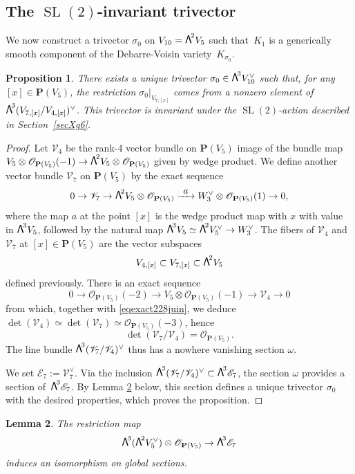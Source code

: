 \documentclass[JEP,XML,SOM,Unicode, NoEqCountersInSection,NoFloatCountersInSection]{cedram}
\let\mathcal\mathscr
\newcommand\To[1]{\mathchoice{\xrightarrow{\textstyle\kern4pt#1\kern3pt}}{\stackrel{#1}{\longrightarrow}}{}{}}
\newtheorem{lemm}{Lemma}[section]
\newtheorem{prop}[lemm]{Proposition}
\theoremstyle{definition}
\renewcommand\P{{\mathbf P}}\let\PP\P
\newcommand\cE{\mathcal{E}}
\newcommand\cO{\mathcal{O}}\let\OO\cO
\newcommand\cV{\mathcal{V}}
\let\isom\simeq
\let\cong\simeq
\let\dual\vee
\DeclareMathOperator{\SL}{SL}
\newcommand\bw[1]{{\hbox{\large$\mathsf{\Lambda}$}^{\!#1}}}
\begin{document}
\subsection{The $\SL(2)$-invariant trivector}\label{se62}

We now construct a trivector $\sigma_0$ on $V_{10}=\bw2V_5$ such that~$K_1$ is a generically smooth component of the Debarre-Voisin
variety~$K_{\sigma_0}$.

\begin{prop}\label{proexistencesigma}
There exists a unique trivector
$\sigma_0\in \bw3V_{10}^\dual$ such that,
for any \hbox{$[x]\!\in\!\P(V_5)$},
the restriction
$\sigma_{0}\vert_{ V_{7,[x]}}$ comes from a nonzero element of $\bw3(V_{7,[x]}/V_{4,[x]})^\dual$. This trivector is invariant under the $\SL(2)$-action described in Section~\ref{secXg6}.
\end{prop}

\begin{proof}
Let $\cV_4$ be the rank-4 vector bundle on $\P(V_5)$ image of the
bundle map $V_5\otimes \cO_{\P(V_5)}(-1)
\to\bw2V_5\otimes \cO_{\P(V_5)}$ given by wedge product. We define another vector bundle
$\cV_7$ on $\P(V_5)$ by the exact sequence
\begin{equation} \label{eqexact228juin}
0\to \cV_7\to \bw2V_5\otimes \cO_{\P(V_5)}
\To{a} W^\dual_3\otimes \cO_{\P(V_5)}(1)\to 0,
\end{equation}
where the map $a$ at the point $[x]$ is the wedge product map with $x$ with value in
$\bw3V_5$, followed by the natural map $\bw3V_5\cong \bw2 V_5^\dual\to W_3^\dual$. The fibers of $\cV_4$ and $\cV_7$ at $[x]\in \P(V_5)$ are the vector subspaces
\[
V_{4,[x]}\subset V_{7,[x]}\subset \bw2V_5 
\]
defined previously. There is an exact sequence
\[
0\to \cO_{\P(V_5)}(-2)\to V_5\otimes \cO_{\P(V_5)}(-1)
\to \cV_4 \to 0
\]
from which, together with \eqref{eqexact228juin}, we deduce
$\det (\cV_4)\isom \det ( \cV_7)\isom\cO_{\P(V_5)}(-3) $,
hence
\[
\det(\cV_7/\cV_4)=\cO_{\P(V_5)}.
\]
The line bundle $\bw3(\cV_7/\cV_4)^\dual$ thus has a nowhere vanishing section
$\omega$.

We set $\cE_7:=\cV_7^\dual$. Via the inclusion $\bw3(\cV_7/\cV_4)^\dual\subset \bw3\cE_7$, the section ${\omega}$ provides a section of~$\bw3\cE_7$. By Lemma \ref{leisosection} below, this section defines a unique trivector $\sigma_0$ with the desired properties, which proves the proposition.\end{proof}

\begin{lemm}\label{leisosection}
The restriction map
\[
\bw3(\bw2V_5^\dual)\otimes \cO_{\P(V_5)}\to \bw3\cE_7
\]
induces an isomorphism on global sections.
\end{lemm}
\end{document}
